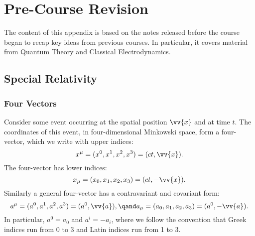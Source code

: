 \chapter{Pre-Course Revision}
The content of this appendix is based on the notes released before the course began to recap key ideas from previous courses.
In particular, it covers material from Quantum Theory and Classical Electrodynamics.

\section{Special Relativity}
\subsection{Four Vectors}
Consider some event occurring at the spatial position \(\vv{x}\) and at time \(t\).
The coordinates of this event, in four-dimensional Minkowski space, form a  four-vector, which we write with upper indices:
\begin{equation}
    x^\mu = (x^0, x^1, x^2, x^3) = (ct, \vv{x}).
\end{equation}
The  four-vector has lower indices:
\begin{equation}
    x_\mu = (x_0, x_1, x_2, x_3) = (ct, -\vv{x}).
\end{equation}
Similarly a general four-vector has a contravariant and covariant form:
\begin{equation}
    a^\mu = (a^0, a^1, a^2, a^3) = (a^0, \vv{a}), \qand a_\mu = (a_0, a_1, a_2, a_3) = (a^0, -\vv{a}).
\end{equation}
In particular, \(a^0 = a_0\) and \(a^i = -a_i\), where we follow the convention that Greek indices run from 0 to 3 and Latin indices run from 1 to 3.

